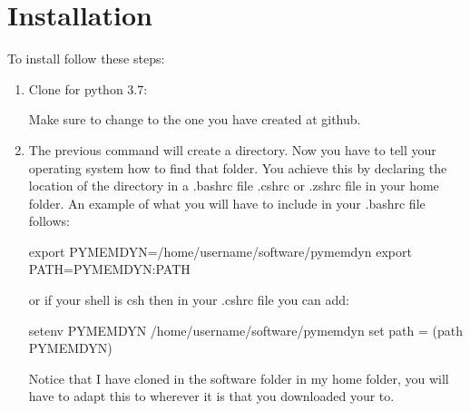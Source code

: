\documentclass[letterpaper,10pt,english]{sphinxmanual}
\begin{document}
\section{Installation}
\label{\detokenize{installation:installation}}
\sphinxAtStartPar
To install  follow these steps:
\begin{enumerate}
%
\item {} 
\sphinxAtStartPar
Clone  for python 3.7:

\begin{sphinxVerbatim}[commandchars=\\\{\}]
  
\end{sphinxVerbatim}

\sphinxAtStartPar
Make sure to change  to the one you have created at github.

\item {} 
\sphinxAtStartPar
The previous command will create a  directory. Now you have
to tell your operating system how to find that folder. You achieve
this by declaring the location of the directory in a .bashrc file
.cshrc or .zshrc file in your home folder. An example of what you
will have to include in your .bashrc file follows:

\begin{sphinxVerbatim}[commandchars=\\\{\}]
export PYMEMDYN=/home/username/software/pymemdyn
export PATH=\PYGZdl{}PYMEMDYN:\PYGZdl{}PATH
\end{sphinxVerbatim}

\sphinxAtStartPar
or if your shell is csh then in your .cshrc file you can add:

\begin{sphinxVerbatim}[commandchars=\\\{\}]
setenv PYMEMDYN /home/username/software/pymemdyn
set path = (\PYGZdl{}path \PYGZdl{}PYMEMDYN)
\end{sphinxVerbatim}

\sphinxAtStartPar
Notice that I have cloned  in the software folder in my
home folder, you will have to adapt this to wherever it is that you
downloaded your  to.


\end{enumerate}
\end{document}
